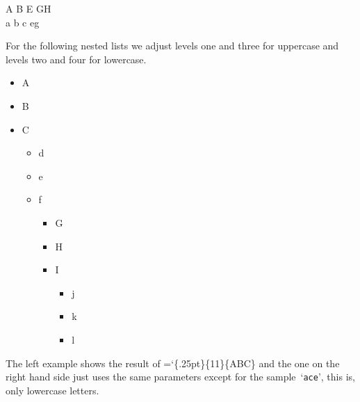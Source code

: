 \documentclass[a4paper]{article}
\newcommand*{\code}[1]{{\ttfamily\hyphenchar\font=`\-\relax #1}}
\newcommand*{\sample}[1]{\mbox{`\texttt{#1}'}}
\begin{document}
\begin{center}
  \makeatletter
  \noindent
  A%
  B%
  E%
  GH  \\
  a%
  b%
  c%
  eg
  \makeatother
\end{center}

For the following nested lists we adjust levels one and three for uppercase and levels two and
four for lowercase.

\begingroup
  \setlength{\itemsep}{0pt}
  \setlength{\parsep}{0pt}
  \setlength{\topsep}{0pt}
  \begin{itemize}
  \item A
  \item B
  \item C
    \begin{itemize}
    \item d
    \item e
    \item f
      \begin{itemize}
      \item G
      \item H
      \item I
        \begin{itemize}
        \item j
        \item k
        \item l
        \end{itemize}
      \end{itemize}
    \end{itemize}
  \end{itemize}
\endgroup
\noadjustlabelitems{*}%

The left example shows the result of \code{\string\typogadjuststairs\{.25pt\}\{11\}\{ABC\}} and
the one on the right hand side just uses the same parameters except for the sample~\sample{ace},
this is, only lowercase letters.

\begin{center}
  \begin{minipage}[t]{12em}
    \centering
  \end{minipage}
  \begin{minipage}[t]{12em}
    \centering
  \end{minipage}
\end{center}
\end{document}
